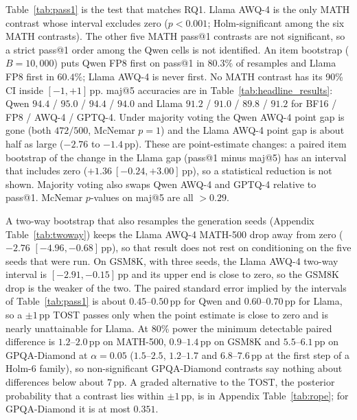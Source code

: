 \documentclass[11pt,a4paper]{article}
\begin{document}
Table~\ref{tab:pass1} is the test that matches RQ1. Llama AWQ-4 is the only MATH contrast whose interval excludes zero ($p<0.001$; Holm-significant among the six MATH contrasts). The other five MATH pass@1 contrasts are not significant, so a strict pass@1 order among the Qwen cells is not identified. An item bootstrap ($B=10{,}000$) puts Qwen FP8 first on pass@1 in $80.3\%$ of resamples and Llama FP8 first in $60.4\%$; Llama AWQ-4 is never first. No MATH contrast has its 90\% CI inside $[-1,+1]$\,pp. maj@5 accuracies are in Table~\ref{tab:headline_results}: Qwen $94.4$ / $95.0$ / $94.4$ / $94.0$ and Llama $91.2$ / $91.0$ / $89.8$ / $91.2$ for BF16 / FP8 / AWQ-4 / GPTQ-4. Under majority voting the Qwen AWQ-4 point gap is gone (both $472/500$, McNemar $p=1$) and the Llama AWQ-4 point gap is about half as large ($-2.76$ to $-1.4$\,pp). These are point-estimate changes: a paired item bootstrap of the change in the Llama gap (pass@1 minus maj@5) has an interval that includes zero ($+1.36\ [-0.24,+3.00]$\,pp), so a statistical reduction is not shown. Majority voting also swaps Qwen AWQ-4 and GPTQ-4 relative to pass@1. McNemar $p$-values on maj@5 are all $>0.29$.

A two-way bootstrap that also resamples the generation seeds (Appendix Table~\ref{tab:twoway}) keeps the Llama AWQ-4 MATH-500 drop away from zero ($-2.76$ $[-4.96,-0.68]$\,pp), so that result does not rest on conditioning on the five seeds that were run. On GSM8K, with three seeds, the Llama AWQ-4 two-way interval is $[-2.91,-0.15]$\,pp and its upper end is close to zero, so the GSM8K drop is the weaker of the two. The paired standard error implied by the intervals of Table~\ref{tab:pass1} is about $0.45$--$0.50$\,pp for Qwen and $0.60$--$0.70$\,pp for Llama, so a $\pm 1$\,pp TOST passes only when the point estimate is close to zero and is nearly unattainable for Llama. At 80\% power the minimum detectable paired difference is $1.2$--$2.0$\,pp on MATH-500, $0.9$--$1.4$\,pp on GSM8K and $5.5$--$6.1$\,pp on GPQA-Diamond at $\alpha=0.05$ ($1.5$--$2.5$, $1.2$--$1.7$ and $6.8$--$7.6$\,pp at the first step of a Holm-6 family), so non-significant GPQA-Diamond contrasts say nothing about differences below about $7$\,pp. A graded alternative to the TOST, the posterior probability that a contrast lies within $\pm 1$\,pp, is in Appendix Table~\ref{tab:rope}; for GPQA-Diamond it is at most $0.351$.
\end{document}
